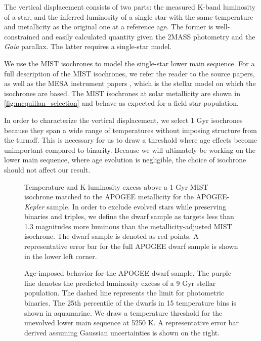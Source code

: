 \documentclass[manuscript]{aastex6}
\newcommand{\Kepler}{\mbox{\textit{Kepler}}}
\newcommand{\Gaia}{\mbox{\textit{Gaia}}}
\begin{document}
The vertical displacement consists of two parts: the measured K-band
luminosity of a star, and the inferred luminosity of a single star with the
same temperature and metallicity as the original one at a reference age. The 
former is well-constrained and easily calculated quantity given the 2MASS 
photometry and the \Gaia{} parallax. The latter requires a single-star model.

We use the MIST \citep{Dotter16,Choi16} isochrones to model the 
single-star lower main sequence. For a full description of the MIST 
isochrones, we refer the reader to the source papers, as well as the MESA 
instrument papers \citep{Paxton11, Paxton13, Paxton15}, which is the stellar 
model on which the isochrones are based. The MIST isochrones at solar
metallicity are shown in \cref{fig:mcquillan_selection} and behave as expected for a field
star population.

In order to characterize the vertical displacement, we select 1 Gyr isochrones 
because they span a wide range of temperatures without imposing
structure from the turnoff. This is necessary for us to draw a threshold where 
age effects become unimportant compared to binarity. Because we will 
ultimately be working on the lower main sequence, where age evolution is 
negligible, the choice of isochrone should not affect our result. 

\begin{figure}[htb]
    \centering
    \caption{Temperature and K luminosity excess above a 1 Gyr MIST isochrone 
        matched to the APOGEE metallicity for the APOGEE-\Kepler{} sample. 
        In order to exclude evolved stars while preserving binaries and
        triples, we define the dwarf sample as targets less than 1.3 magnitudes
        more luminous than the metallicity-adjusted MIST isochrone. The dwarf 
        sample is denoted as red points. A representative error bar for the 
        full APOGEE dwarf sample is shown in the lower left 
    corner.}\label{fig:sample_dk}
\end{figure}

\begin{figure}[htb]
    \centering
    \caption{Age-imposed behavior for the APOGEE dwarf sample. The purple
        line denotes the predicted luminosity excess of a 9 Gyr stellar 
        population. The dashed line represents the limit for photometric
        binaries. The 25th percentile of the dwarfs in 15 temperature bins is
        shown in aquamarine. We draw a temperature threshold for the unevolved
        lower main sequence at 5250 K. A representative error bar
derived assuming Gaussian uncertainties is shown on the right.}
    \label{fig:ages}
\end{figure}
\end{document}
